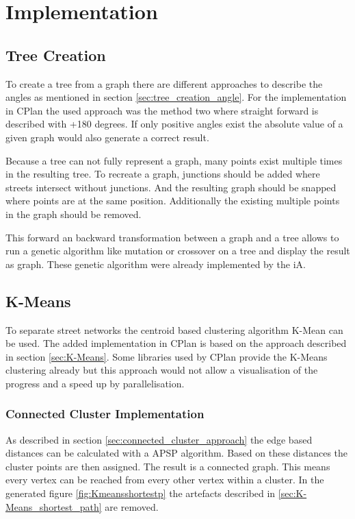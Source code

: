 \pagebreak
\chapter{Implementation}
\section{Tree Creation}
To create a tree from a graph there are different approaches to describe the angles as mentioned in section \ref{sec:tree_creation_angle}. For the implementation in CPlan the used approach was the method two where straight forward is described with +180 degrees. If only positive angles exist the absolute value of a given graph would also generate a correct result.

Because a tree can not fully represent a graph, many points exist multiple times in the resulting tree. To recreate a graph, junctions should be added where streets intersect without junctions. And the resulting graph should be snapped where points are at the same position. Additionally the existing multiple points in the graph should be removed.

This forward an backward transformation between a graph and a tree allows to run a genetic algorithm like mutation or crossover on a tree and display the result as graph. These genetic algorithm were already implemented by the \acrlong{iA}.

\pagebreak
\section{K-Means}
To separate street networks the centroid based clustering algorithm K-Mean can be used. The added implementation in CPlan \citep{cPlan:2015} is based on the approach described in section \ref{sec:K-Means}. Some libraries used by CPlan provide the K-Means clustering already but this approach would not allow a visualisation of the progress and a speed up by parallelisation.

\subsection{Connected Cluster Implementation} \label{sec:K-Means_shortest_path_impl}
As described in section \ref{sec:connected_cluster_approach} the edge based distances can be calculated with a \gls{APSP} algorithm. Based on these distances the cluster points are then assigned. The result is a connected graph. This means every vertex can be reached from every other vertex within a cluster. In the generated figure \ref{fig:Kmeansshortestp} the artefacts described in \ref{sec:K-Means_shortest_path} are removed.

